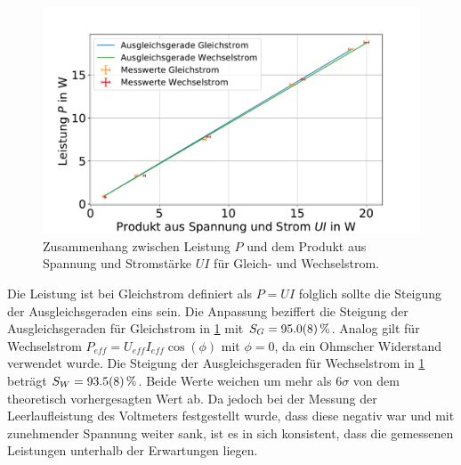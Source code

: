 



\begin{figure}
	\centering
	\includegraphics[width=0.9\linewidth]{"auswertung/Auswertung Innenwiderstand/Leistung 2"}
	\caption{Zusammenhang zwischen Leistung $P$ und dem Produkt aus Spannung und Stromstärke $UI$ für Gleich- und Wechselstrom.}
	\label{fig:leistung-r2}
\end{figure}




Die Leistung ist bei Gleichstrom definiert als $P=UI$ folglich sollte die Steigung der Ausgleichsgeraden eins sein. Die Anpassung beziffert die Steigung der Ausgleichsgeraden für Gleichstrom in \cref{fig:leistung-r2} mit $S_{G}=\SI{ 95.0+-0.8}{\percent}$. Analog gilt für Wechselstrom $P_{eff}=U_{eff}  I_{eff} \cos(\phi)$ mit $\phi=0$, da ein Ohmscher Widerstand verwendet wurde. Die Steigung der Ausgleichsgeraden für Wechselstrom in \cref{fig:leistung-r2} beträgt $S_W=\SI{93.5+-0.8}{\percent}$. Beide Werte weichen um mehr als $6\sigma$ von dem theoretisch vorhergesagten Wert ab. Da jedoch bei der Messung der Leerlaufleistung des Voltmeters festgestellt wurde, dass diese negativ war und mit zunehmender Spannung weiter sank, ist es in sich konsistent, dass die gemessenen Leistungen unterhalb der Erwartungen liegen.














